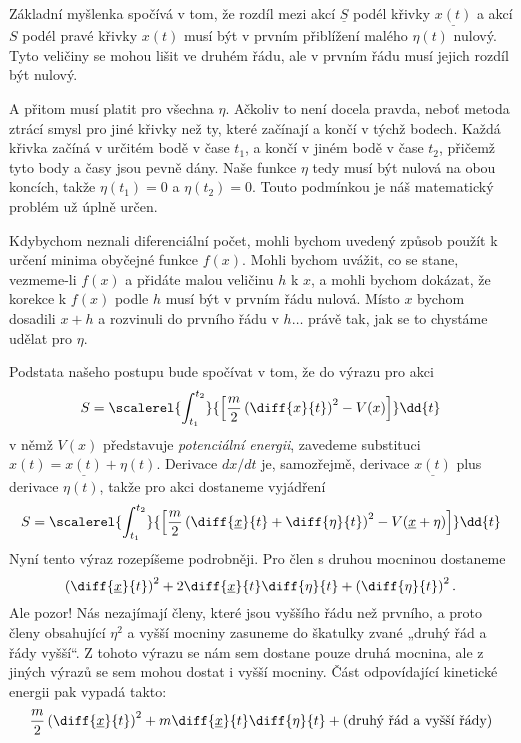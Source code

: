 
    Základní myšlenka spočívá v tom, že rozdíl mezi akcí \(\underline{S}\) podél křivky
    \(\underline{x(t)}\) a akcí \(S\) podél pravé křivky \(x(t)\) musí být v prvním přiblížení
    malého \(\eta(t)\) nulový. Tyto veličiny se mohou lišit ve druhém řádu, ale v prvním řádu musí
    jejich rozdíl být nulový.

    A přitom musí platit pro všechna \(\eta\). Ačkoliv to není docela pravda, neboť metoda ztrácí
    smysl pro jiné křivky než ty, které začínají a končí v týchž bodech. Každá křivka začíná v
    určitém bodě v čase \(t_1\), a končí v jiném bodě v čase \(t_2\), přičemž tyto body a časy jsou
    pevně dány. Naše funkce \(\eta\) tedy musí být nulová na obou koncích, takže \(\eta(t_1)=0\) a
    \(\eta(t_2)=0\). Touto podmínkou je náš matematický problém už úplně určen.

    Kdybychom neznali diferenciální počet, mohli bychom uvedený způsob použít k určení minima
    obyčejné funkce \(f(x)\). Mohli bychom uvážit, co se stane, vezmeme-li \(f(x)\) a přidáte malou
    veličinu \(h\) k \(x\), a mohli bychom dokázat, že korekce k \(f(x)\) podle \(h\) musí být v
    prvním řádu nulová. Místo \(x\) bychom dosadili \(x+h\) a rozvinuli do prvního řádu v
    \(h\ldots\) právě tak, jak se to chystáme udělat pro \(\eta\).

    Podstata našeho postupu bude spočívat v tom, že do výrazu pro akci
    \begin{equation*}
      S = \scalerel{\int_{t_1}^{t_2}}{
            \left[\frac{m}{2}\left(\diff{x}{t}\right)^2 - V(x) \right]
          }\dd{t}
    \end{equation*}
    v němž \(V(x)\) představuje \emph{potenciální energii}, zavedeme substituci \(x(t) =
    \underline{x(t)}+\eta(t)\). Derivace \(dx/dt\) je, samozřejmě, derivace \(\underline{x(t)}\)
    plus derivace \(\eta(t)\), takže pro akci dostaneme vyjádření
    \begin{equation*}
      S = \scalerel{\int_{t_1}^{t_2}}{
            \left[\frac{m}{2}\left(\diff{\underline{x}}{t}+\diff{\eta}{t}\right)^2 
            - V(\underline{x}+\eta)\right]
          }\dd{t}
    \end{equation*}
    Nyní tento výraz rozepíšeme podrobněji. Pro člen s druhou mocninou dostaneme
    \begin{equation*}
      \left(\diff{\underline{x}}{t}\right)^2 + 2\diff{\underline{x}}{t}\diff{\eta}{t} 
      + \left(\diff{\eta}{t}\right)^2.
    \end{equation*}
    Ale pozor! Nás nezajímají členy, které jsou vyššího řádu než prvního, a proto členy obsahující
    \(\eta^2\) a vyšší mocniny zasuneme do škatulky zvané „druhý řád a řády vyšší“. Z tohoto výrazu
    se nám sem dostane pouze druhá mocnina, ale z jiných výrazů se sem mohou dostat i vyšší mocniny.
    Část odpovídající kinetické energii pak vypadá takto:
    \begin{equation*}
      \dfrac{m}{2}\left(\diff{\underline{x}}{t}\right)^2 + m\diff{\underline{x}}{t}\diff{\eta}{t} + 
      (\text{druhý řád a vyšší řády})
    \end{equation*}

